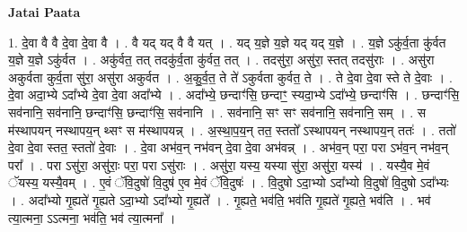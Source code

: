 \documentclass[17pt]{extarticle}
\begin{document}
\textbf{Jatai Paata} \newline

1. दे॒वा वै वै दे॒वा दे॒वा वै । . वै यद् यद् वै वै यत् । . यद् य॒ज्ञे य॒ज्ञे यद् यद् य॒ज्ञे । . य॒ज्ञे ऽकु॑र्व॒ता कु॑र्वत य॒ज्ञे य॒ज्ञे ऽकु॑र्वत । . अकु॑र्वत॒ तत् तदकु॑र्व॒ता कु॑र्वत॒ तत् । . तदसु॑रा॒ असु॑रा॒ स्तत् तदसु॑राः । . असु॑रा अकुर्वता कुर्व॒ता सु॑रा॒ असु॑रा अकुर्वत । . अ॒कु॒र्व॒त॒ ते ते॑ ऽकुर्वता कुर्वत॒ ते । . ते दे॒वा दे॒वा स्ते ते दे॒वाः । . दे॒वा अदा॒भ्ये ऽदा᳚भ्ये दे॒वा दे॒वा अदा᳚भ्ये । . अदा᳚भ्ये॒ छन्दाꣳ॑सि॒ छन्दाꣳ॒॒ स्यदा॒भ्ये ऽदा᳚भ्ये॒ छन्दाꣳ॑सि । . छन्दाꣳ॑सि॒ सव॑नानि॒ सव॑नानि॒ छन्दाꣳ॑सि॒ छन्दाꣳ॑सि॒ सव॑नानि । . सव॑नानि॒ सꣳ सꣳ सव॑नानि॒ सव॑नानि॒ सम् । . स म॑स्थापयन् नस्थापय॒न् थ्सꣳ स म॑स्थापयन्न् । . अ॒स्था॒प॒य॒न् तत॒ स्ततो᳚ ऽस्थापयन् नस्थापय॒न् ततः॑ । . ततो॑ दे॒वा दे॒वा स्तत॒ स्ततो॑ दे॒वाः । . दे॒वा अभ॑व॒न् नभ॑वन् दे॒वा दे॒वा अभ॑वन्न् । . अभ॑व॒न् परा॒ परा ऽभ॑व॒न् नभ॑व॒न् परा᳚ । . परा ऽसु॑रा॒ असु॑राः॒ परा॒ परा ऽसु॑राः । . असु॑रा॒ यस्य॒ यस्या सु॑रा॒ असु॑रा॒ यस्य॑ । . यस्यै॒व मे॒वं ॅयस्य॒ यस्यै॒वम् । . ए॒वं ॅवि॒दुषो॑ वि॒दुष॑ ए॒व मे॒वं ॅवि॒दुषः॑ । . वि॒दुषो ऽदा॒भ्यो ऽदा᳚भ्यो वि॒दुषो॑ वि॒दुषो ऽदा᳚भ्यः । . अदा᳚भ्यो गृ॒ह्यते॑ गृ॒ह्यते ऽदा॒भ्यो ऽदा᳚भ्यो गृ॒ह्यते᳚ । . गृ॒ह्यते॒ भव॑ति॒ भव॑ति गृ॒ह्यते॑ गृ॒ह्यते॒ भव॑ति । . भव॑ त्या॒त्मना॒ ऽऽत्मना॒ भव॑ति॒ भव॑ त्या॒त्मना᳚ । \newline
\end{document}
